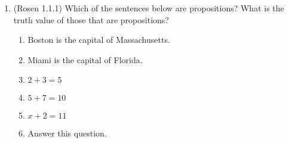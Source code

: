 \begin{enumerate}
\item \streasy (Rosen 1.1.1) Which of the sentences below are propositions?
What is the truth value of those that are propositions?

\begin{enumerate}
\item Boston is the capital of Massachusetts.

\item Miami is the capital of Florida.

\item $2+3=5$

\item $5+7=10$

\item $x+2=11$

\item Answer this question.
\end{enumerate}

%
%
%
%
%


\end{enumerate}
